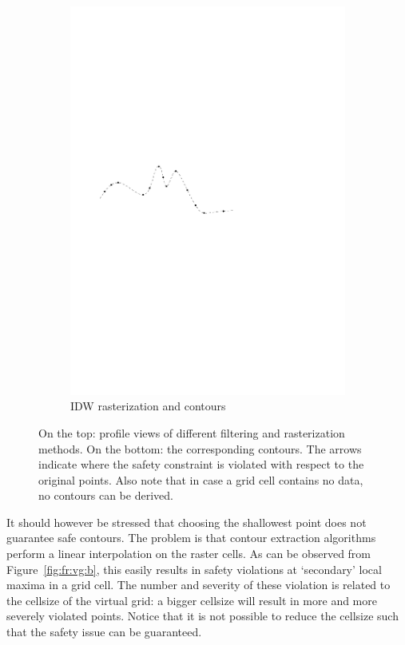\begin{figure}
\begin{subfigure}[b]{0.3\linewidth}
    \includegraphics[width=\textwidth,page=5]{figs/1Didw.pdf}
    \caption{IDW rasterization and contours}\label{fig:fr:idw:b}
  \end{subfigure}
\caption{On the top: profile views of different filtering and rasterization methods. On the bottom: the corresponding contours. The arrows indicate where the safety constraint is violated with respect to the original points. Also note that in case a grid cell contains no data, no contours can be derived.}
\label{fig:filterraster}
\end{figure}
It should however be stressed that choosing the shallowest point does not guarantee safe contours. 
The problem is that contour extraction algorithms perform a linear interpolation on the raster cells. 
As can be observed from Figure~\ref{fig:fr:vg:b}, this easily results in safety violations at `secondary' local maxima in a grid cell. 
The number and severity of these violation is related to the cellsize of the virtual grid: a bigger cellsize will result in more and more severely violated points.
Notice that it is not possible to reduce the cellsize such that the safety issue can be guaranteed.  

